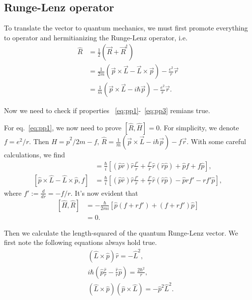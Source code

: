 \documentclass[a4paper,11pt]{article}
\theoremstyle{remark}
\theoremstyle{defn}
\begin{document}
\subsection{Runge-Lenz operator}
To translate the vector to quantum mechanics, we must first promote everything to operator and 
hermitianizing the Runge-Lenz operator, i.e.
\begin{equation}
\begin{split}
\hat{R} &= \frac{1}{2}(\vec{R}+\vec{R}^{\dagger})\\
&= \frac{1}{2m}(\vec{p}\times\vec{L}-\vec{L}\times\vec{p})-\frac{e^2}{r}\vec{r}\\
&= \frac{1}{m}(\vec{p}\times\vec{L}-i\hbar \vec{p})-\frac{e^2}{r}\vec{r}.
\end{split}
\end{equation}
\par Now we need to check if properties ~\eqref{eq:pp1}-~\eqref{eq:pp3} remians true. \par
For eq.~\eqref{eq:pp1}, we now need to prove $[\hat{R},\hat{H}]=0$. For simplicity, we denote $f=e^2/r$.
Then $\hat{H} = \hat{p}^2/2m-f,\,\hat{R} = \frac{1}{m}(\vec{p}\times\vec{L}-i\hbar \vec{p})-f\vec{r}$. 
With some careful calculations, we find
\begin{align}
[\hat{p}^2,f\vec{r}] &= \frac{\hbar}{i}[(\hat{p}\hat{r})\hat{r}\frac{f'}{r}+\frac{f'}{r}\hat{r}(\hat{r}\hat{p})+\hat{p}f+f\hat{p}],\\ 
[\hat{p}\times\hat{L}-\hat{L}\times\hat{p},f] &=
\frac{\hbar}{i}[(\hat{p}\hat{r})\hat{r}\frac{f'}{r}+\frac{f'}{r}\hat{r}(\hat{r}\hat{p})-\hat{p}rf'-rf'\hat{p}],
\end{align}
where $f' := \frac{d}{dr} = -f/r$. It's now evident that 
\begin{equation}
\begin{split}
[\hat{H},\hat{R}] &=  -\frac{\hbar}{2mi}[\hat{p}(f+rf')+(f+rf')\hat{p}]\\
&=0.
\end{split}
\end{equation}
\par Then we calculate the length-squared of the quantum Runge-Lenz vector. We first note the following equations always hold true.
\begin{align}
&(\hat{L}\times\hat{p})\hat{r} = -\hat{L}^2, \label{eq:1} \\
&i\hbar(\hat{p}\frac{\hat{r}}{r} - \frac{\hat{r}}{r}\hat{p}) = \frac{2\hbar^2}{r}, \label{eq:t2} \\
&(\hat{L}\times\hat{p})(\hat{p}\times\hat{L}) = -\hat{p}^2\hat{L}^2. \label{eq:t3}
\end{align}
\end{document}
